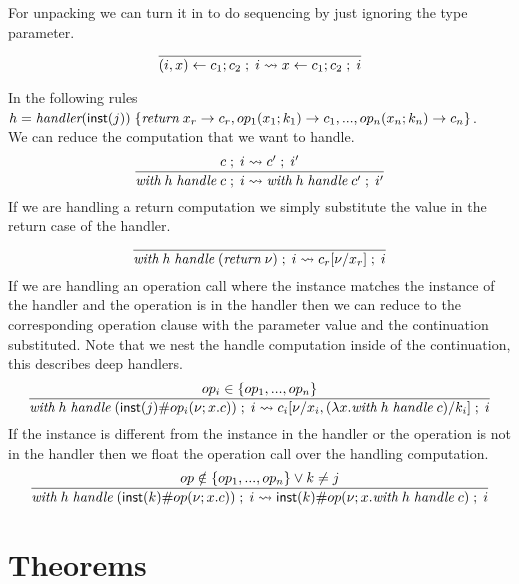 For unpacking we can turn it in to do sequencing by just ignoring the type parameter.\\
\[\frac{
}{
	(i, x) \leftarrow c_1 ; c_2\;;\; i \rightsquigarrow x \leftarrow c_1 ; c_2\;;\; i
}\]

In the following rules \\$h = 
	\textit{handler} ( \mathsf{inst}(j) ) \; \{
		\textit{return} \; x_r \rightarrow c_r,
		op_1(x_1 ; k_1) \rightarrow c_1,
		...,
		op_n(x_n ; k_n) \rightarrow c_n
	\}$.\\
We can reduce the computation that we want to handle.\\
\[\frac{
	c\;;\; i \rightsquigarrow c'\;;\; i'
}{
	\textit{with} \; h \; \textit{handle} \; c\;;\; i \rightsquigarrow \textit{with} \; h \; \textit{handle} \; c'\;;\; i'
}\]
If we are handling a return computation we simply substitute the value in the return case of the handler.\\
\[\frac{
}{
\textit{with} \; h \; \textit{handle} \; (\textit{return} \; \nu)\;;\; i \rightsquigarrow c_r[\nu/x_r]\;;\; i
}\]
If we are handling an operation call where the instance matches the instance of the handler and the operation is in the handler then we can reduce to the corresponding operation clause with the parameter value and the continuation substituted.
Note that we nest the handle computation inside of the continuation, this describes deep handlers.\\
\[\frac{
	op_i \in \{op_1, ..., op_n \}
}{
	\textit{with} \; h \; \textit{handle} \; (\mathsf{inst}(j) \# op_i(\nu ; x . c))\;;\; i \rightsquigarrow c_i[\nu/x_i, (\lambda x . \textit{with} \; h \; \textit{handle} \; c)/k_i]\;;\; i
}\]
If the instance is different from the instance in the handler or the operation is not in the handler then we float the operation
call over the handling computation.\\
\[\frac{
	op \notin \{op_1, ..., op_n \} \lor k \neq j
}{
	\textit{with} \; h \; \textit{handle} \; (\mathsf{inst}(k) \# op(\nu ; x . c))\;;\; i \rightsquigarrow \mathsf{inst}(k) \# op(\nu ; x . \textit{with} \; h \; \textit{handle} \; c)\;;\; i
}\]

\newpage
\section{Theorems}

